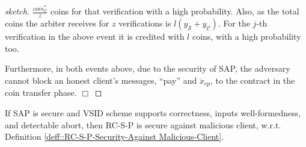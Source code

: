 \begin{proof}[sketch]
$\frac{coin_{\scriptscriptstyle\mathcal C}^{\scriptscriptstyle*}}{z}$ coins  for that verification with a high probability. Also,  as the total coins the arbiter receives for $z$ verifications is $l(y_{\scriptscriptstyle\mathcal S}+y_{\scriptscriptstyle\mathcal C})$. For the $j$-th verification in the above event it is credited with $l$ coins, with a high probability too. 



Furthermore, in   both  events above, due to the security of SAP, the adversary cannot block an honest client's  messages, ``pay'' and $\ddot{x}_{\scriptscriptstyle cp}$, to the contract in the coin transfer phase.
  \hfill\(\Box\)\end{proof}



\begin{lemma}
 If SAP is secure and  VSID scheme supports correctness, inputs well-formedness, and detectable abort, then RC-S-P is secure against malicious client, w.r.t. Definition \ref{deff::RC-S-P-Security-Against Malicious-Client}. 
\end{lemma}


